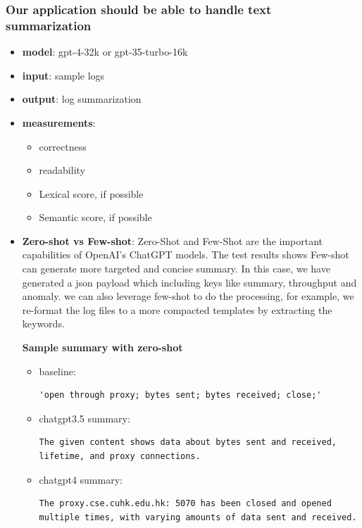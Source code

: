 \documentclass[conference]{IEEEtran}
\begin{document}
\subsubsection{Our application should be able to handle text summarization}
\begin{itemize}
    \item \textbf{model}: gpt-4-32k or gpt-35-turbo-16k 
    \item \textbf{input}: sample logs
    \item \textbf{output}: log summarization
    \item \textbf{measurements}:
    \begin{itemize}
        \item correctness
        \item readability
        \item Lexical score, if possible
        \item Semantic score, if possible
    \end{itemize}
    \item \textbf{Zero-shot vs Few-shot}: 
 Zero-Shot and Few-Shot are the important capabilities of OpenAI's ChatGPT models. The test results shows Few-shot can generate more targeted and concise summary. In this case, we have generated a json payload which including keys like summary, throughput and anomaly. 
 we can also leverage few-shot to do the processing, for example, we re-format the log files to a more compacted templates by extracting the keywords. 
 
   \textbf{ Sample summary with zero-shot}
    \begin{itemize}
    \item baseline: 
    \begin{lstlisting}[numbers=none]
'open through proxy; bytes sent; bytes received; close;'
    \end{lstlisting}
    \item chatgpt3.5 summary: 
    \begin{lstlisting}[numbers=none]
The given content shows data about bytes sent and received, lifetime, and proxy connections.
    \end{lstlisting}
    \item chatgpt4 summary: 
    \begin{lstlisting}[numbers=none]
The proxy.cse.cuhk.edu.hk: 5070 has been closed and opened multiple times, with varying amounts of data sent and received.
    \end{lstlisting}
    \end{itemize}
    

\end{itemize}
\end{document}
